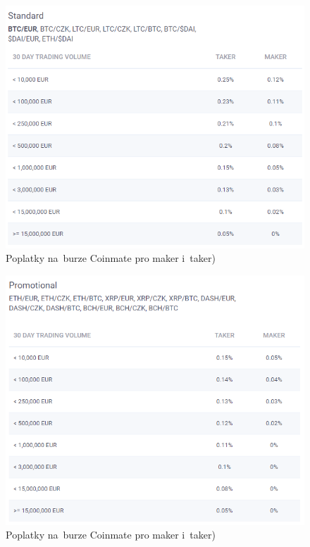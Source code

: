 \documentclass[thesis=B,czech]{FITthesis}[2019/03/21]
\begin{document}
\begin{figure}\centering
	\includegraphics[width=1\textwidth]{images/coinmate_standard.PNG}
	\caption{Poplatky na~burze Coinmate pro maker i~taker) \cite{coinmate_fees}}\label{coinmate_standard}
\end{figure}
\begin{figure}\centering
	\includegraphics[width=1\textwidth]{images/coinmate_promotional.PNG}
	\caption{Poplatky na~burze Coinmate pro maker i~taker) \cite{coinmate_fees}}\label{coinmate_promotional}
\end{figure}
\end{document}
